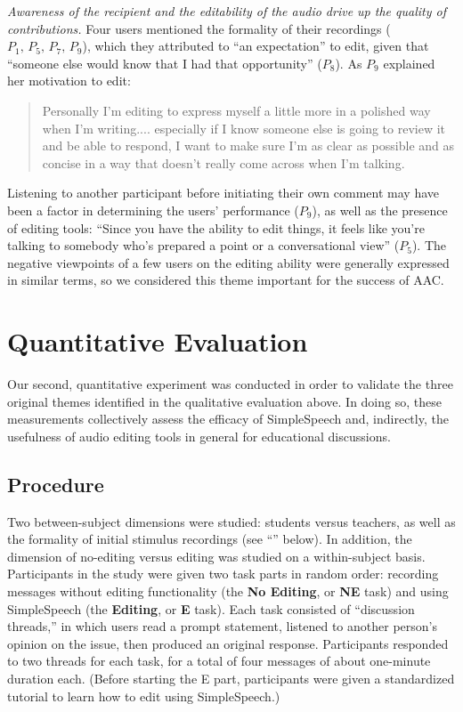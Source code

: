 \emph{Awareness of the recipient and the editability of the audio drive up the quality of contributions.}
Four users mentioned the formality of their recordings ($P_1,\,P_5,\,P_7,\,P_9$), which they attributed to ``an expectation'' to edit, given that ``someone else would know that I had that opportunity'' ($P_8$).
As $P_9$ explained her motivation to edit:
\begin{quote}
	Personally I'm editing to express myself a little more in a polished way when I'm writing.... especially if I know someone else is going to review it and be able to respond, I want to make sure I'm as clear as possible and as concise in a way that doesn't really come across when I'm talking.
\end{quote}
Listening to another participant before initiating their own comment may have been a factor in determining the users' performance ($P_9$), as well as the presence of editing tools: ``Since you have the ability to edit things, it feels like you're talking to somebody who's prepared a point or a conversational view'' ($P_5$). 
The negative viewpoints of a few users on the editing ability were generally expressed in similar terms, so we considered this theme important for the success of AAC.

\section{Quantitative Evaluation}
Our second, quantitative experiment was conducted in order to validate the three original themes identified in the qualitative evaluation above.
In doing so, these measurements collectively assess the efficacy of SimpleSpeech and, indirectly, the usefulness of audio editing tools in general for educational discussions.

\subsection{Procedure}
Two between-subject dimensions were studied: students versus teachers, as well as the formality of initial stimulus recordings (see ``'' below).
In addition, the dimension of no-editing versus editing was studied on a within-subject basis.
Participants in the study were given two task parts in random order: recording messages without editing functionality (the \textbf{No Editing}, or \textbf{NE} task) and using SimpleSpeech (the \textbf{Editing}, or \textbf{E} task). 
Each task consisted of ``discussion threads,'' in which users read a prompt statement, listened to another person's opinion on the issue, then produced an original response.
Participants responded to two threads for each task, for a total of four messages of about one-minute duration each.
(Before starting the E part, participants were given a standardized tutorial to learn how to edit using SimpleSpeech.)

